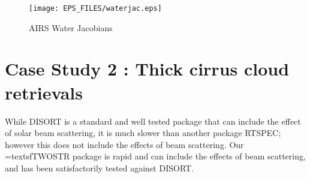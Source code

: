 \documentclass[11pt]{article}
\begin{document}




\begin{figure}
\texttt{[image: EPS\_FILES/waterjac.eps]}
\caption{AIRS Water Jacobians}
\label{fig:waterAIRS}
\end{figure}

\section{Case Study 2 : Thick cirrus cloud retrievals}

While \textsf{DISORT} is a 
standard and well tested package that can include the effect of solar beam 
scattering, it is much slower than another package \textsf{RTSPEC}; however
this does not include the effects of beam scattering. Our =textsf{TWOSTR}
package is rapid and can include the effects of beam scattering, and has been
satisfactorily tested against \textsf{DISORT}.
\end{document}
